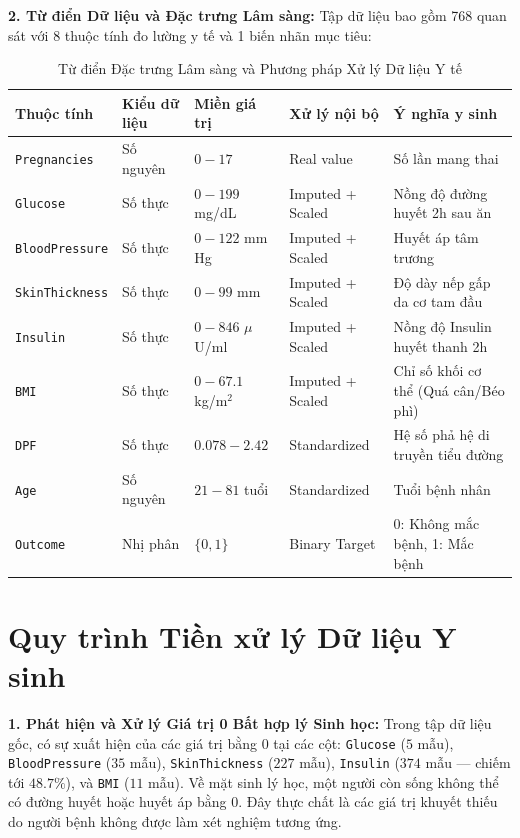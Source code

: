 \documentclass[12pt,a4paper]{report}
\begin{document}
\textbf{2. Từ điển Dữ liệu và Đặc trưng Lâm sàng:}
Tập dữ liệu bao gồm 768 quan sát với 8 thuộc tính đo lường y tế và 1 biến nhãn mục tiêu:

\begin{table}[H]
\centering
\small
\begin{tabularx}{\textwidth}{llllX}
\toprule
\textbf{Thuộc tính} & \textbf{Kiểu dữ liệu} & \textbf{Miền giá trị} & \textbf{Xử lý nội bộ} & \textbf{Ý nghĩa y sinh} \\
\midrule
\texttt{Pregnancies} & Số nguyên & $0 - 17$ & Real value & Số lần mang thai \\
\texttt{Glucose} & Số thực & $0 - 199$ mg/dL & Imputed + Scaled & Nồng độ đường huyết 2h sau ăn \\
\texttt{BloodPressure} & Số thực & $0 - 122$ mm Hg & Imputed + Scaled & Huyết áp tâm trương \\
\texttt{SkinThickness} & Số thực & $0 - 99$ mm & Imputed + Scaled & Độ dày nếp gấp da cơ tam đầu \\
\texttt{Insulin} & Số thực & $0 - 846$ $\mu$U/ml & Imputed + Scaled & Nồng độ Insulin huyết thanh 2h \\
\texttt{BMI} & Số thực & $0 - 67.1$ kg/m$^2$ & Imputed + Scaled & Chỉ số khối cơ thể (Quá cân/Béo phì) \\
\texttt{DPF} & Số thực & $0.078 - 2.42$ & Standardized & Hệ số phả hệ di truyền tiểu đường \\
\texttt{Age} & Số nguyên & $21 - 81$ tuổi & Standardized & Tuổi bệnh nhân \\
\midrule
\texttt{Outcome} & Nhị phân & $\{0, 1\}$ & Binary Target & 0: Không mắc bệnh, 1: Mắc bệnh \\
\bottomrule
\end{tabularx}
\caption{Từ điển Đặc trưng Lâm sàng và Phương pháp Xử lý Dữ liệu Y tế}
\label{tab:diabetes_features}
\end{table}

\section{Quy trình Tiền xử lý Dữ liệu Y sinh}
\textbf{1. Phát hiện và Xử lý Giá trị 0 Bất hợp lý Sinh học:}
Trong tập dữ liệu gốc, có sự xuất hiện của các giá trị bằng $0$ tại các cột: \texttt{Glucose} ($5$ mẫu), \texttt{BloodPressure} ($35$ mẫu), \texttt{SkinThickness} ($227$ mẫu), \texttt{Insulin} ($374$ mẫu — chiếm tới $48.7\%$), và \texttt{BMI} ($11$ mẫu). Về mặt sinh lý học, một người còn sống không thể có đường huyết hoặc huyết áp bằng $0$. Đây thực chất là các giá trị khuyết thiếu do người bệnh không được làm xét nghiệm tương ứng.
\end{document}
